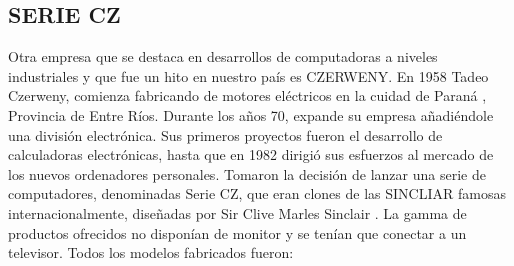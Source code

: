 \documentclass[%
 	final,
%
	notitlepage,
	narroweqnarray,
	inline,
 	twoside,
	]{ieee}
\begin{document}
\subsection*{SERIE CZ}

Otra empresa que se destaca en desarrollos de computadoras a niveles industriales y que fue un hito en nuestro pa\'is es CZERWENY. En 1958 Tadeo Czerweny, comienza fabricando de motores el\'ectricos en la cuidad de Paran\'a , Provincia de Entre R\'ios. Durante los a\~nos 70, expande su empresa a\~nadi\'endole una divisi\'on electr\'onica. Sus primeros proyectos fueron el desarrollo de calculadoras electr\'onicas, hasta que en 1982 dirigi\'o sus esfuerzos al mercado de los nuevos ordenadores personales. Tomaron la decisi\'on de lanzar una serie de computadores, denominadas Serie CZ, que eran clones de las SINCLIAR famosas internacionalmente, dise\~nadas por Sir Clive Marles Sinclair \cite{sinclair}.
La gamma de productos ofrecidos no dispon\'ian de monitor y se ten\'ian que conectar a un televisor. Todos los modelos fabricados fueron:
\end{document}

